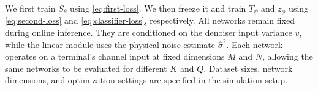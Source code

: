 We first train $S_\theta$ using \eqref{eq:first-loss}.
We then freeze it and train $T_\psi$ and $z_\phi$ using
\eqref{eq:second-loss} and \eqref{eq:classifier-loss}, respectively.
All networks remain fixed during online inference. They are conditioned
on the denoiser input variance $v$, while the linear module uses the
physical noise estimate $\widehat\sigma^2$. Each network operates on a terminal's channel
input at fixed dimensions $M$ and $N$, allowing the same networks to
be evaluated for different $K$ and $Q$.
Dataset sizes, network dimensions, and optimization settings are
specified in the simulation setup.
